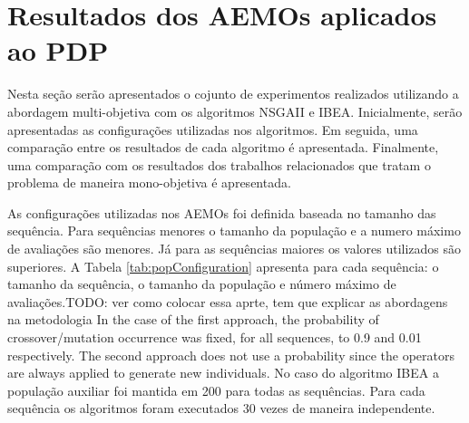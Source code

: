 \section{Resultados dos AEMOs aplicados ao PDP}

Nesta seção serão apresentados o cojunto de experimentos realizados utilizando a abordagem multi-objetiva com os algoritmos NSGAII e IBEA. Inicialmente, serão apresentadas as configurações utilizadas nos algoritmos. Em seguida, uma comparação entre os resultados de cada algoritmo é apresentada. Finalmente, uma comparação com os resultados dos trabalhos relacionados que tratam o problema de maneira mono-objetiva é apresentada.




As configurações utilizadas nos AEMOs foi definida baseada no tamanho das sequência. Para sequências menores o tamanho da população e a numero máximo de avaliações são menores. Já para as sequências maiores os valores utilizados são superiores. A Tabela \ref{tab:popConfiguration} apresenta para cada sequência: o tamanho da sequência, o tamanho da população e número máximo de avaliações.TODO: ver como colocar essa aprte, tem que explicar as abordagens na metodologia In the case of the first approach, the probability of crossover/mutation occurrence was fixed, for all sequences, to 0.9 and 0.01 respectively. The second approach does not use a probability since the operators are always applied to generate new individuals. 
No caso do algoritmo IBEA a população auxiliar foi mantida em 200 para todas as sequências. Para cada sequência os algoritmos foram executados 30 vezes de maneira independente.


